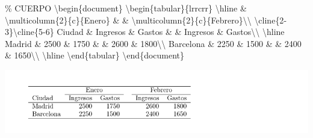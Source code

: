 \documentclass[
  a4paper,
]{scrreport}
\newenvironment{Shaded}{\begin{snugshade}}{\end{snugshade}}
\newcommand{\CommentTok}[1]{\textcolor[rgb]{0.37,0.37,0.37}{#1}}
\newcommand{\ExtensionTok}[1]{\textcolor[rgb]{0.00,0.23,0.31}{#1}}
\newcommand{\FunctionTok}[1]{\textcolor[rgb]{0.28,0.35,0.67}{#1}}
\newcommand{\KeywordTok}[1]{\textcolor[rgb]{0.00,0.23,0.31}{#1}}
\newcommand{\NormalTok}[1]{\textcolor[rgb]{0.00,0.23,0.31}{#1}}
\newcommand{\OperatorTok}[1]{\textcolor[rgb]{0.37,0.37,0.37}{#1}}
\begin{document}
\begin{Shaded}
\begin{Highlighting}[]
\CommentTok{\% CUERPO}
\KeywordTok{\textbackslash{}begin}\NormalTok{\{}\ExtensionTok{document}\NormalTok{\}}
\KeywordTok{\textbackslash{}begin}\NormalTok{\{}\ExtensionTok{tabular}\NormalTok{\}\{lrrcrr\}}
\FunctionTok{\textbackslash{}hline}
 \OperatorTok{\&} \FunctionTok{\textbackslash{}multicolumn}\NormalTok{\{2\}\{c\}\{Enero\} }\OperatorTok{\&} \OperatorTok{\&} \FunctionTok{\textbackslash{}multicolumn}\NormalTok{\{2\}\{c\}\{Febrero\}}\FunctionTok{\textbackslash{}\textbackslash{}}
\FunctionTok{\textbackslash{}cline}\NormalTok{\{2{-}3\}}\FunctionTok{\textbackslash{}cline}\NormalTok{\{5{-}6\}}
\NormalTok{Ciudad }\OperatorTok{\&}\NormalTok{ Ingresos }\OperatorTok{\&}\NormalTok{ Gastos }\OperatorTok{\&} \OperatorTok{\&}\NormalTok{ Ingresos }\OperatorTok{\&}\NormalTok{ Gastos}\FunctionTok{\textbackslash{}\textbackslash{}} 
\FunctionTok{\textbackslash{}hline}
\NormalTok{Madrid }\OperatorTok{\&}\NormalTok{ 2500 }\OperatorTok{\&}\NormalTok{ 1750 }\OperatorTok{\&} \OperatorTok{\&}\NormalTok{ 2600 }\OperatorTok{\&}\NormalTok{ 1800}\FunctionTok{\textbackslash{}\textbackslash{}} 
\NormalTok{Barcelona }\OperatorTok{\&}\NormalTok{ 2250 }\OperatorTok{\&}\NormalTok{ 1500 }\OperatorTok{\&} \OperatorTok{\&}\NormalTok{ 2400 }\OperatorTok{\&}\NormalTok{ 1650}\FunctionTok{\textbackslash{}\textbackslash{}} 
\FunctionTok{\textbackslash{}hline}
\KeywordTok{\textbackslash{}end}\NormalTok{\{}\ExtensionTok{tabular}\NormalTok{\}}
\KeywordTok{\textbackslash{}end}\NormalTok{\{}\ExtensionTok{document}\NormalTok{\}}
\end{Highlighting}
\end{Shaded}

\begin{tcolorbox}[enhanced jigsaw, bottomrule=.15mm, leftrule=.75mm, opacityback=0, titlerule=0mm, bottomtitle=1mm, colbacktitle=quarto-callout-note-color!10!white, arc=.35mm, toprule=.15mm, colframe=quarto-callout-note-color-frame, title={Salida}, coltitle=black, colback=white, breakable, toptitle=1mm, rightrule=.15mm, left=2mm, opacitybacktitle=0.6]

\includegraphics{./img/tablas/tabla-multicolumna.png}

\end{tcolorbox}
\end{document}
